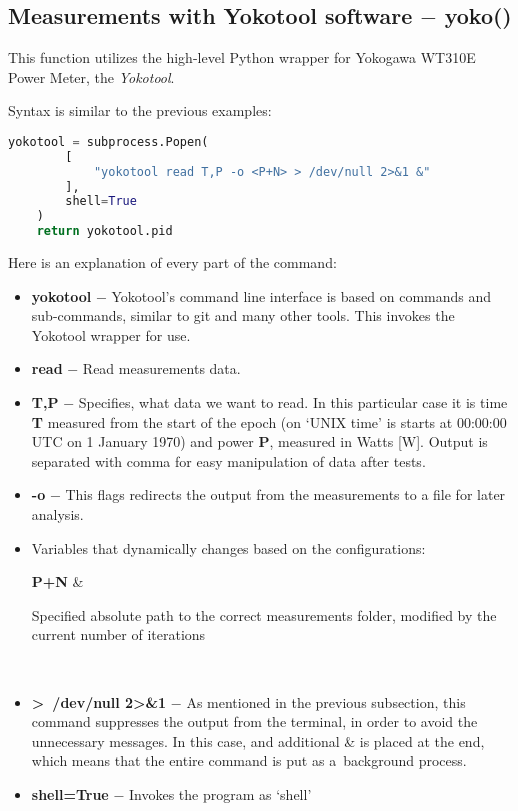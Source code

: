 \newpage

\subsection{Measurements with Yokotool software $-$ yoko\@()}

This function utilizes the high-level Python wrapper for Yokogawa WT310E Power
Meter, the \emph{Yokotool}.

Syntax is similar to the previous examples:

\begin{lstlisting}[language=Python]
    yokotool = subprocess.Popen(
        [
            "yokotool read T,P -o <P+N> > /dev/null 2>&1 &"
        ],
        shell=True
    )
    return yokotool.pid
\end{lstlisting}

Here is an explanation of every part of the command:

\begin{itemize}
    \item \textbf{yokotool} $-$ Yokotool's command line interface is based
    on commands and sub-commands, similar to git and many other tools. This
    invokes the Yokotool wrapper for use.
    \item \textbf{read} $-$ Read measurements data.
    \item \textbf{T,P} $-$ Specifies, what data we want to read. In this
    particular case it is time \textbf{T} measured from the start of the epoch
    (on `UNIX time' is starts at 00:00:00 UTC on 1 January 1970) and power
    \textbf{P}, measured in Watts [W]. Output is separated with comma for
    easy manipulation of data after tests.
    \item \textbf{-o} $-$ This flags redirects the output from the
    measurements to a file for later analysis.
    \item Variables that dynamically changes based on the configurations:
    \begin{conditions}
        \textbf{P+N} & \parbox[t]{12cm}{Specified absolute path to
        the correct measurements folder, modified by the current number of
        iterations} \\
    \end{conditions}
    \item \textbf{\textgreater~/dev/null 2\textgreater\&1} $-$
    As mentioned in the previous subsection, this command suppresses the
    output from the terminal, in order to avoid the unnecessary messages.
    In this case, and additional \& is placed at the end, which means that
    the entire command is put as a~background process.
    \item \textbf{shell=True} $-$ Invokes the program as `shell'
\end{itemize}

